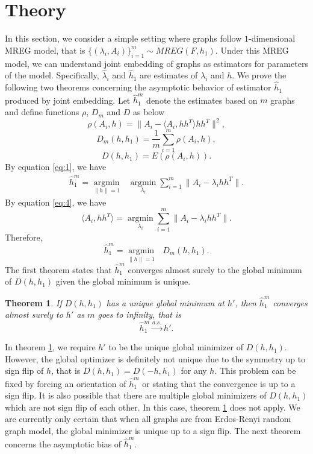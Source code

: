 \documentclass[10pt,journal,compsoc]{IEEEtran}
\newtheorem{theorem}{Theorem}[section]
\begin{document}
\section{Theory}
In this section, we consider a simple setting where graphs follow $1$-dimensional MREG model, that is $\{(\lambda_i,A_i)\} _{i=1}^m \sim MREG(F,h_1)$. Under this MREG model, we can understand joint embedding of graphs as estimators for parameters of the model. Specifically, $\hat{\lambda}_i$ and $\hat{h}_1$ are estimates of $\lambda_i$ and $h$. We prove the following two theorems concerning the asymptotic behavior of estimator $\hat{h}_1$ produced by joint embedding. Let $\hat{h}_1^m$ denote the estimates based on $m$ graphs and define functions $\rho$, $D_m$ and $D$ as below
\[ \rho(A_i,h)= \|A_i- \langle A_i,h h^T \rangle h h^T\|^2, \]
\[ D_m(h,h_1) =\frac{1}{m}\sum_{i=1}^{m} \rho(A_i,h), \]
\[ D(h,h_1) = E(\rho(A_i,h)). \]
By equation \eqref{eq:1}, we have
\begin{align*} 
\hat{h}_1^m = \underset{\|h\| =1}{\operatorname{argmin}} \text{ }   \underset{\lambda_i}{\operatorname{argmin}} \sum_{i=1}^{m} \|A_i - \lambda_i h h^T\| .
\end{align*}
By equation \eqref{eq:4}, we have 
\[\langle A_i,hh^T \rangle=\underset{\lambda_i}{\operatorname{argmin}} \sum_{i=1}^{m} \|A_i - \lambda_i h h^T\|.\]
Therefore,
\[\hat{h}_1^m = \underset{\|h\| =1}{\operatorname{argmin}} \text{ } D_m(h,h_1). \]
The first theorem states that $\hat{h}_1^m$  converges almost surely to the global minimum of $D(h,h_1)$ given the global minimum is unique.
\begin{theorem}
	\label{thm:1}
	If $D(h,h_1)$ has a unique global minimum at $h'$, then $\hat{h}_1^m$ converges almost surely to $h'$ as $m$ goes to infinity, that is 
	\[ \hat{h}_1^m \overset{a.s.}{\rightarrow} h'. \]
\end{theorem}

\noindent In theorem \ref{thm:1}, we require $h'$ to be the unique global minimizer of $D(h,h_1)$. However, the global optimizer is definitely not unique due to the symmetry up to sign flip of $h$, that is $D(h,h_1)=D(-h,h_1)$ for any $h$. This problem can be fixed by forcing an orientation of $\hat{h}_1^m$ or stating that the convergence is up to a sign flip. It is also possible that there are multiple global minimizers of $D(h,h_1)$ which are not sign flip of each other. In this case, theorem \ref{thm:1} does not apply. We are currently only certain that when all graphs are from Erdos-Renyi random graph model, the global minimizer is unique up to a sign flip. The next theorem concerns the asymptotic bias of $\hat{h}_1^m$. 
\end{document}
